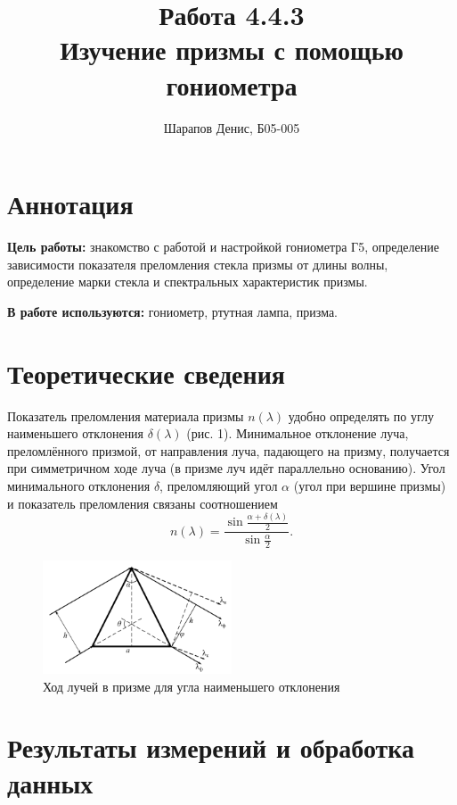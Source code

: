 \documentclass[a4paper]{article}
\title{Работа 4.4.3 \\ Изучение призмы с помощью гониометра}
\author{Шарапов Денис, Б05-005}
\date{}
\begin{document}
    \maketitle
    \tableofcontents
    \newpage
    
\section{Аннотация}

\noindent\textbf{Цель работы:} знакомство с работой и настройкой гониометра Г5, определение зависимости показателя преломления стекла призмы от длины волны, определение марки стекла и спектральных характеристик призмы. \smallskip
 
\noindent \textbf{В работе используются:} гониометр, ртутная лампа, призма.

\section{Теоретические сведения}

Показатель преломления материала призмы $n(\lambda)$ удобно определять
по углу наименьшего отклонения $\delta(\lambda)$ (рис. 1). Минимальное отклонение луча, преломлённого призмой, от направления луча, падающего
на призму, получается при симметричном ходе луча (в призме луч идёт
параллельно основанию). Угол минимального отклонения $\delta$, преломляющий угол $\alpha$ (угол при вершине призмы) и показатель преломления
связаны соотношением $$n(\lambda) = \frac{\sin{\frac{\alpha + \delta(\lambda)}{2}}}{\sin{\frac{\alpha}{2}}}.$$

\begin{figure}[ht!]
    \centering
    \includegraphics[width = 0.5\textwidth]{image/pic1.png}
    \caption{Ход лучей в призме для угла наименьшего отклонения}
\end{figure}

\section{Результаты измерений и обработка данных}
\end{document}
